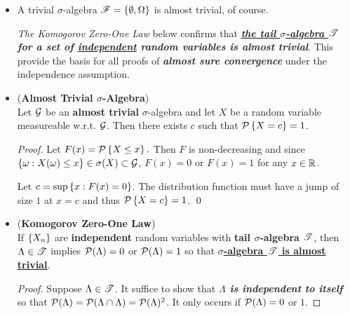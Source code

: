 \documentclass[11pt]{article}
\begin{document}
\begin{itemize}
\item \begin{remark}
A trivial $\sigma$-algebra  ${\mathscr F} = \left\{\emptyset, \Omega\right\}$ is almost trivial, of course. 

\emph{The Komogorov Zero-One Law} below confirms that \emph{\textbf{\underline{the tail $\sigma$-algebra ${\mathscr T}$} for a set of \underline{independent} random variables is almost trivial}}. This provide the basis for all proofs of \emph{\textbf{almost sure convergence}} under the independence assumption. 
\end{remark}


\item \begin{lemma} (\textbf{Almost Trivial $\sigma$-Algebra}) \citep{resnick2013probability} \\
Let ${\mathcal G}$ be an \textbf{almost trivial} $\sigma$-algebra and let $X$ be a random variable measureable w.r.t. ${\mathcal G}$. Then there exists $c$ such that ${\mathcal P}\left\{X=c\right\}=1$.
\end{lemma}
\begin{proof}
Let $F(x) = {\mathcal P}\left\{X\le x\right\}.$ Then $F$ is non-decreasing and since $\left\{\omega: X(\omega)\le x\right\}\in \sigma(X)\subset {\mathcal G}$, $F(x)=0$ or $F(x)=1$ for any $x\in {\mathbb R}$. 

Let $c= \sup\left\{x: F(x)=0\right\}$. The distribution function must have a jump of size $1$ at $x=c$ and thus ${\mathcal P}\left\{X=c\right\}= 1$. \qed
\end{proof}


\item \begin{theorem}(\textbf{Komogorov Zero-One Law}) \citep{resnick2013probability} \\
If $\left\{X_{n}\right\}$ are \textbf{independent} random variables with \textbf{tail $\sigma$-algebra} ${\mathscr T}$, then $\Lambda\in {\mathscr T}$ implies ${\mathcal P}(\Lambda)=0$ or ${\mathcal P}(\Lambda)=1$ so that \underline{\textbf{$\sigma$-algebra ${\mathscr T}$ is almost trivial}}. 
\end{theorem}
\begin{proof}
Suppose  $\Lambda\in {\mathscr T}$. It suffice to show that \emph{\textbf{$\Lambda$ is independent to itself}} so that ${\mathcal P}(\Lambda) = {\mathcal P}(\Lambda\cap \Lambda) = {\mathcal P}(\Lambda)^{2}$. It only occurs if ${\mathcal P}(\Lambda)= 0$ or $1$.


\end{proof}
\end{itemize}
\end{document}
